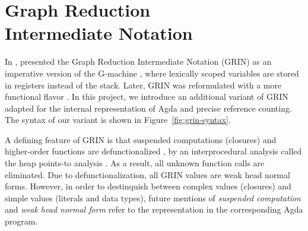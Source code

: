 \documentclass[9pt, twocolumn]{article}
\begin{document}
\section{Graph Reduction \\ Intermediate Notation}
\label{sec:grin}
In \citeyear{johnsson1991}, \citeauthor{johnsson1991} presented the Graph Reduction Intermediate Notation (GRIN) as an imperative version of the G-machine \citep{johnsson1984}, where lexically scoped variables are stored in registers instead of the stack. 
Later, GRIN was reformulated with a more functional flavor \citep{boquist1995}.
In this project, we introduce an additional variant of GRIN adapted for the internal representation of Agda and precise reference counting. 
The syntax of our variant is shown in \mbox{Figure \ref{fig:grin-syntax}}.

A defining feature of GRIN is that suspended computations (closures) and higher-order functions are defunctionalized \citep{reynolds1972}, by 
an interprocedural analysis called the heap points-to analysis \citep{boquist1999}.
As a result, all unknown function calls are eliminated. 
Due to defunctionalization, all GRIN values are weak head normal forms.
However, in order to destinquish between complex values (closures) and simple values (literals and data types), 
future mentions of \emph{suspended computation} and \emph{weak head normal form} refer to the representation in the corresponding Agda program.
\end{document}
